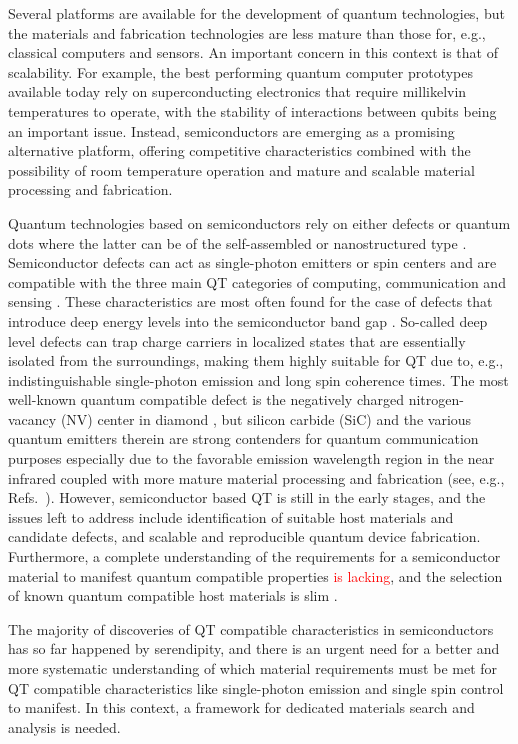 \documentclass[superscriptaddress,unsortedaddress,
 amsmath,amssymb,
 aps,
]{revtex4-2}
\newcommand{\mrk}[1]{\textcolor{red}{#1}}
\begin{document}
Several platforms are available for the development of quantum technologies, but the materials and fabrication technologies are less mature than those for, e.g., classical computers and sensors. 
An important concern in this context is that of scalability. 
For example, the best performing quantum computer prototypes available today rely on superconducting electronics that require millikelvin temperatures to operate, with the stability of interactions between qubits being an important issue. Instead, semiconductors are emerging as a promising alternative platform, offering competitive characteristics combined with the possibility of room temperature operation and mature and scalable material processing and fabrication.  

Quantum technologies based on semiconductors rely on either defects or quantum dots where the latter can be of the self-assembled or nanostructured type \cite{Aharonovich_2016}. 
Semiconductor defects can act as single-photon emitters or spin centers and are compatible with the three main QT categories of computing, communication and sensing \cite{Awschalom_2018}. 
These characteristics are most often found for the case of defects that introduce deep energy levels into the semiconductor band gap \cite{Weber2010}. So-called deep level defects can trap charge carriers in localized states that are essentially isolated from the surroundings, making them highly suitable for QT due to, e.g., indistinguishable single-photon emission and long spin coherence times. 
The most well-known quantum compatible defect is the negatively charged nitrogen-vacancy (NV) center in diamond \cite{Doherty_2013}, but silicon carbide (SiC) and the various quantum emitters therein are strong contenders for quantum communication purposes especially due to the favorable emission wavelength region in the near infrared coupled with more mature material processing and fabrication (see, e.g., Refs.~\cite{Castelletto_2015,Son2020,Bathen2021}). However, semiconductor based QT is still in the early stages, and the issues left to address include identification of suitable host materials and candidate defects, and scalable and reproducible quantum device fabrication. 
Furthermore, a complete understanding of the requirements for a semiconductor material to manifest quantum compatible properties \mrk{is lacking},  
and the selection of known quantum compatible host materials is slim \cite{Atatuere2018,Zhang2020}. 

The majority of discoveries of QT compatible characteristics in semiconductors has so far happened by serendipity, and there is an urgent need for a better and more systematic understanding of which material requirements must be met for QT compatible characteristics like single-photon emission and single spin control to manifest. In this context, a framework for dedicated materials search and analysis is needed. 
\end{document}
